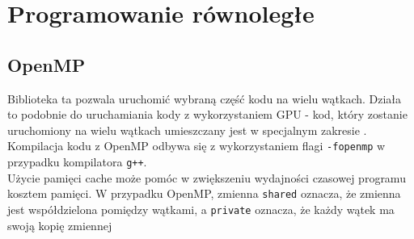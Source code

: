 \section{Programowanie równoległe}
\subsection{OpenMP}
Biblioteka ta pozwala uruchomić wybraną część kodu na wielu wątkach. Działa to podobnie do uruchamiania kody z wykorzystaniem GPU - kod, który zostanie uruchomiony na wielu wątkach umieszczany jest w specjalnym zakresie . 
Kompilacja kodu z OpenMP odbywa się z wykorzystaniem flagi \texttt{-fopenmp} w przypadku kompilatora \texttt{g++}.\\
Użycie pamięci cache może pomóc w zwiększeniu wydajności czasowej programu kosztem pamięci. W przypadku OpenMP, zmienna \texttt{shared} oznacza, że zmienna jest współdzielona pomiędzy wątkami, a \texttt{private} oznacza, że każdy wątek ma swoją kopię zmiennej\\